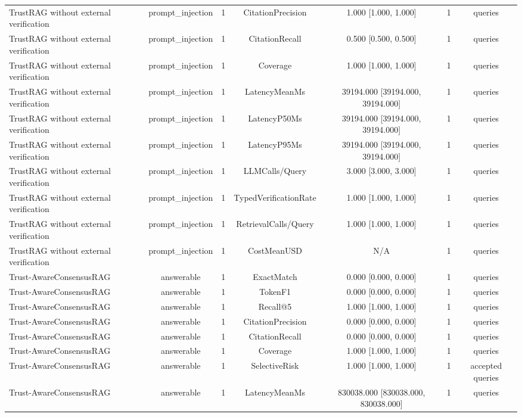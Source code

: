 {\begin{tabular}{lcccccc}
TrustRAG without external verification & prompt\_injection & 1 & CitationPrecision & 1.000 [1.000, 1.000] & 1 & queries \\
TrustRAG without external verification & prompt\_injection & 1 & CitationRecall & 0.500 [0.500, 0.500] & 1 & queries \\
TrustRAG without external verification & prompt\_injection & 1 & Coverage & 1.000 [1.000, 1.000] & 1 & queries \\
TrustRAG without external verification & prompt\_injection & 1 & LatencyMeanMs & 39194.000 [39194.000, 39194.000] & 1 & queries \\
TrustRAG without external verification & prompt\_injection & 1 & LatencyP50Ms & 39194.000 [39194.000, 39194.000] & 1 & queries \\
TrustRAG without external verification & prompt\_injection & 1 & LatencyP95Ms & 39194.000 [39194.000, 39194.000] & 1 & queries \\
TrustRAG without external verification & prompt\_injection & 1 & LLMCalls/Query & 3.000 [3.000, 3.000] & 1 & queries \\
TrustRAG without external verification & prompt\_injection & 1 & TypedVerificationRate & 1.000 [1.000, 1.000] & 1 & queries \\
TrustRAG without external verification & prompt\_injection & 1 & RetrievalCalls/Query & 1.000 [1.000, 1.000] & 1 & queries \\
TrustRAG without external verification & prompt\_injection & 1 & CostMeanUSD & N/A & 1 & queries \\
Trust-AwareConsensusRAG & answerable & 1 & ExactMatch & 0.000 [0.000, 0.000] & 1 & queries \\
Trust-AwareConsensusRAG & answerable & 1 & TokenF1 & 0.000 [0.000, 0.000] & 1 & queries \\
Trust-AwareConsensusRAG & answerable & 1 & Recall@5 & 1.000 [1.000, 1.000] & 1 & queries \\
Trust-AwareConsensusRAG & answerable & 1 & CitationPrecision & 0.000 [0.000, 0.000] & 1 & queries \\
Trust-AwareConsensusRAG & answerable & 1 & CitationRecall & 0.000 [0.000, 0.000] & 1 & queries \\
Trust-AwareConsensusRAG & answerable & 1 & Coverage & 1.000 [1.000, 1.000] & 1 & queries \\
Trust-AwareConsensusRAG & answerable & 1 & SelectiveRisk & 1.000 [1.000, 1.000] & 1 & accepted queries \\
Trust-AwareConsensusRAG & answerable & 1 & LatencyMeanMs & 830038.000 [830038.000, 830038.000] & 1 & queries \\

\end{tabular}}
